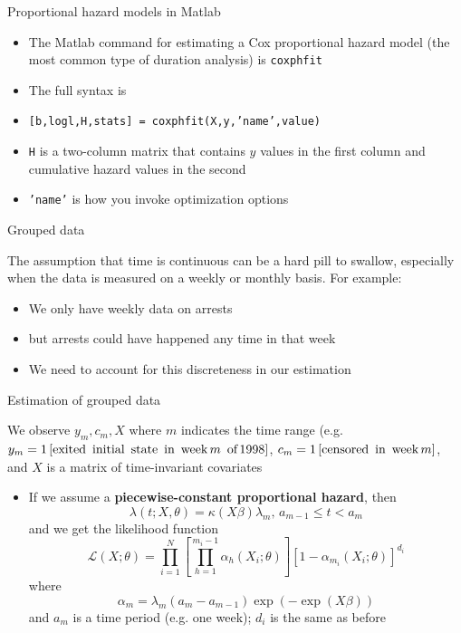 \documentclass[english,xcolor=dvipsnames]{beamer}
\begin{document}
\begin{frame}{Proportional hazard models in Matlab}
\begin{itemize}
\item The Matlab command for estimating a Cox proportional hazard model
(the most common type of duration analysis) is \texttt{coxphfit}
\item The full syntax is
\item \texttt{{[}b,logl,H,stats{]} = coxphfit(X,y,'name',value)}
\item \texttt{H} is a two-column matrix that contains $y$ values in the
first column and cumulative hazard values in the second
\item \texttt{'name'} is how you invoke optimization options
\end{itemize}

\end{frame}


\begin{frame}{Grouped data}

The assumption that time is continuous can be a hard pill to swallow,
especially when the data is measured on a weekly or monthly basis.
For example:
\begin{itemize}
\item We only have weekly data on arrests
\item but arrests could have happened any time in that week
\item We need to account for this discreteness in our estimation
\end{itemize}

\end{frame}


\begin{frame}{Estimation of grouped data}

We observe $y_{m},c_{m},X$ where $m$ indicates the time range (e.g.
$y_{m}=1\left[\mbox{exited\, initial\, state\, in\, week\,\ensuremath{m}\, of\,1998}\right]$,
$c_{m}=1\left[\mbox{censored\, in\, week\,}m\right]$, and $X$ is
a matrix of time-invariant covariates
\begin{itemize}
\item If we assume a \textbf{piecewise-constant proportional hazard}, then
\[
\lambda\left(t;X,\theta\right)=\kappa\left(X\beta\right)\lambda_{m},\, a_{m-1}\leq t<a_{m}
\]
and we get the likelihood function
\[
\mathcal{L}\left(X;\theta\right)=\prod_{i=1}^{N}\left[\prod_{h=1}^{m_{i}-1}\alpha_{h}\left(X_{i};\theta\right)\right]\left[1-\alpha_{m_{i}}\left(X_{i};\theta\right)\right]^{d_{i}}
\]
where
\[
\alpha_{m}=\lambda_{m}\left(a_{m}-a_{m-1}\right)\exp\left(-\exp\left(X\beta\right)\right)
\]
and $a_{m}$ is a time period (e.g. one week); $d_{i}$ is the same
as before
\end{itemize}

\end{frame}
\end{document}
